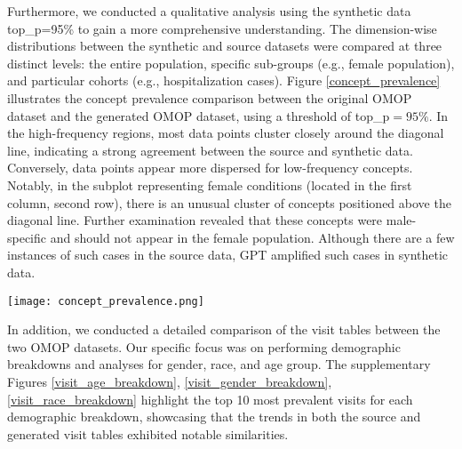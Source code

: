\begin{multicols}{2}
Furthermore, we conducted a qualitative analysis using the synthetic data top\_p=95\% to gain a more comprehensive understanding. The dimension-wise distributions between the synthetic and source datasets were compared at three distinct levels: the entire population, specific sub-groups (e.g., female population), and particular cohorts (e.g., hospitalization cases). Figure \ref{concept_prevalence} illustrates the concept prevalence comparison between the original OMOP dataset and the generated OMOP dataset, using a threshold of top\_p$=95\%$. In the high-frequency regions, most data points cluster closely around the diagonal line, indicating a strong agreement between the source and synthetic data. Conversely, data points appear more dispersed for low-frequency concepts. Notably, in the subplot representing female conditions (located in the first column, second row), there is an unusual cluster of concepts positioned above the diagonal line. Further examination revealed that these concepts were male-specific and should not appear in the female population. Although there are a few instances of such cases in the source data, GPT amplified such cases in synthetic data. 

\begin{Figure}
    \texttt{[image: concept\_prevalence.png]}
    \label{concept_prevalence}
\end{Figure}

In addition, we conducted a detailed comparison of the visit tables between the two OMOP datasets. Our specific focus was on performing demographic breakdowns and analyses for gender, race, and age group. The supplementary Figures \ref{visit_age_breakdown}, \ref{visit_gender_breakdown}, \ref{visit_race_breakdown}  highlight the top 10 most prevalent visits for each demographic breakdown, showcasing that the trends in both the source and generated visit tables exhibited notable similarities.


\end{multicols}
